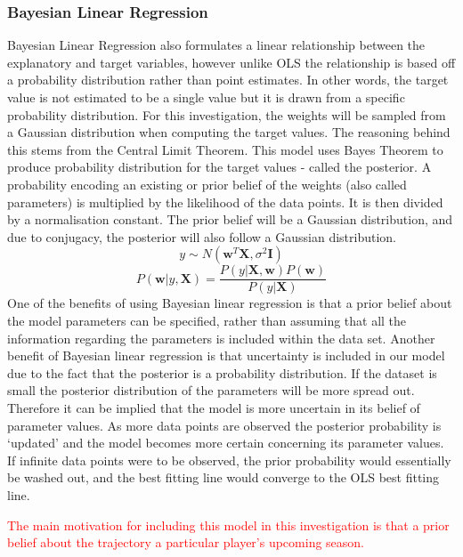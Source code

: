 \documentclass[a4paper,11pt,twoside]{article}
\begin{document}
\subsubsection{Bayesian Linear Regression}
Bayesian Linear Regression also formulates a linear relationship between the explanatory and target variables, however unlike OLS the relationship is based off a probability distribution rather than point estimates. In other words, the target value is not estimated to be a single value but it is drawn from a specific probability distribution. For this investigation, the weights will be sampled from a Gaussian distribution when computing the target values. The reasoning behind this stems from the Central Limit Theorem. This model uses Bayes Theorem to produce probability distribution for the target values - called the posterior. A probability encoding an existing or prior belief of the weights (also called parameters) is multiplied by the likelihood of the data points. It is then divided by a normalisation constant. The prior belief will be a Gaussian distribution, and due to conjugacy, the posterior will also follow a Gaussian distribution. 
\begin{equation}
 y \sim N(\textbf{w}^T\textbf{X}, \sigma^2\textbf{I})
\end{equation}
\begin{equation}
P(\textbf{w}|y,\textbf{X}) = \frac{P(y|\textbf{X},\textbf{w})P(\textbf{w})}{P(y|\textbf{X})}
\end{equation}
One of the benefits of using Bayesian linear regression is that a prior belief about the model parameters can be specified, rather than assuming that all the information regarding the parameters is included within the data set. Another benefit of Bayesian linear regression is that uncertainty is included in our model due to the fact that the posterior is a probability distribution. If the dataset is small the posterior distribution of the parameters will be more spread out. Therefore it can be implied that the model is more uncertain in its belief of parameter values. As more data points are observed the posterior probability is `updated' and the model becomes more certain concerning its parameter values. If infinite data points were to be observed, the prior probability would essentially be washed out, and the best fitting line would converge to the OLS best fitting line.

\textcolor{red}{The main motivation for including this model in this investigation is that a prior belief about the trajectory a particular player's upcoming season.}
\end{document}
